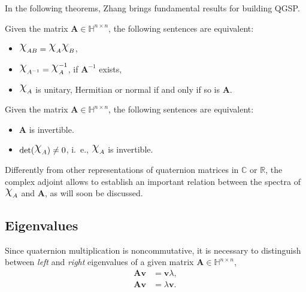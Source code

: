 In the following theorems, Zhang brings fundamental results for building QGSP.

\begin{theorem}
\label{th:equiv01}
Given the matrix $ \mathbf{A} \in \mathbb{H}^{n \times n} $, the following sentences are equivalent:

\begin{itemize}[noitemsep]
\item $ \rchi_{AB} = \rchi_{A} \rchi_{B} $,
\item $ \rchi_{A^{-1}} = \rchi_{A}^{-1}$, if $ \mathbf{A}^{-1} $ exists,
\item $ \rchi_{A}$ is unitary, Hermitian or normal if and only if so is $ \mathbf{A} $.
\end{itemize}

\end{theorem}

\begin{theorem}
\label{th:equiv02}
Given the matrix $ \mathbf{A} \in \mathbb{H}^{n \times n} $, the following sentences are equivalent:

\begin{itemize}[noitemsep]
\item $\mathbf{A}$ is invertible.
\item $\mathrm{det}(\rchi_A) \neq 0$, i.~e., $\rchi_{A}$ is invertible.
\end{itemize}

\end{theorem}

Differently from other representations of quaternion matrices in $ \mathbb{C} $ or $ \mathbb{R} $, the complex adjoint allows to establish an important relation between the spectra of $ \rchi_{A} $ and $ \mathbf{A} $, as will soon be discussed.

\subsection{Eigenvalues}
Since quaternion multiplication is noncommutative, it is necessary to distinguish between \textit{left} and \textit{right} eigenvalues of a given matrix $ \mathbf{A} \in \mathbb{H}^{n \times n} $,
\begin{align*}
\mathbf{A} \mathbf{v} &= \mathbf{v} \lambda, \tag{right} \\
\mathbf{A} \mathbf{v} &= \lambda \mathbf{v}.  \tag{left}
\end{align*}

